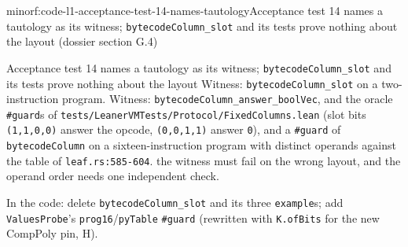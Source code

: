 \begin{finding}{minor}{f:code-l1-acceptance-test-14-names-tautology}{Acceptance test 14 names a tautology as its witness; \texttt{bytecodeColumn\_\allowbreak{}slot} and its tests prove nothing about the layout (dossier section G.4)}
\begin{change}{Acceptance test 14 names a tautology as its witness; \texttt{bytecodeColumn\_\allowbreak{}slot} and its tests prove nothing about the layout}
\asis Witness: \texttt{bytecodeColumn\_\allowbreak{}slot} on a two-instruction program.
\asproposed Witness: \texttt{b\allowbreak{}y\allowbreak{}t\allowbreak{}e\allowbreak{}c\allowbreak{}o\allowbreak{}d\allowbreak{}e\allowbreak{}C\allowbreak{}o\allowbreak{}l\allowbreak{}u\allowbreak{}m\allowbreak{}n\allowbreak{}\_\allowbreak{}a\allowbreak{}n\allowbreak{}s\allowbreak{}w\allowbreak{}e\allowbreak{}r\allowbreak{}\_\allowbreak{}b\allowbreak{}o\allowbreak{}o\allowbreak{}l\allowbreak{}V\allowbreak{}e\allowbreak{}c}, and the oracle \texttt{\#guard}s of \texttt{t\allowbreak{}e\allowbreak{}s\allowbreak{}t\allowbreak{}s\allowbreak{}/\allowbreak{}L\allowbreak{}e\allowbreak{}a\allowbreak{}n\allowbreak{}e\allowbreak{}r\allowbreak{}V\allowbreak{}M\allowbreak{}T\allowbreak{}e\allowbreak{}s\allowbreak{}t\allowbreak{}s\allowbreak{}/\allowbreak{}P\allowbreak{}r\allowbreak{}o\allowbreak{}t\allowbreak{}o\allowbreak{}c\allowbreak{}o\allowbreak{}l\allowbreak{}/\allowbreak{}F\allowbreak{}i\allowbreak{}x\allowbreak{}e\allowbreak{}d\allowbreak{}C\allowbreak{}o\allowbreak{}l\allowbreak{}u\allowbreak{}m\allowbreak{}n\allowbreak{}s\allowbreak{}.\allowbreak{}l\allowbreak{}e\allowbreak{}a\allowbreak{}n} (slot bits \texttt{(\allowbreak{}1,\allowbreak{}1,\allowbreak{}0,\allowbreak{}0)} answer the opcode, \texttt{(\allowbreak{}0,\allowbreak{}0,\allowbreak{}1,\allowbreak{}1)} answer \texttt{0}), and a \texttt{\#guard} of \texttt{bytecodeColumn} on a sixteen-instruction program with distinct operands against the table of \texttt{leaf.\allowbreak{}rs:585-{}604}.
\reason the witness must fail on the wrong layout, and the operand order needs one independent check.
\end{change}
In the code: delete \texttt{bytecodeColumn\_\allowbreak{}slot} and its three \texttt{example}s; add \texttt{ValuesProbe}'s \texttt{prog16}/\texttt{pyTable} \texttt{\#guard} (rewritten with \texttt{K.\allowbreak{}ofBits} for the new CompPoly pin, H).


\end{finding}

